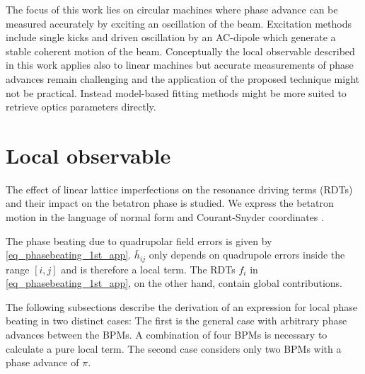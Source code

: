 The focus of this work lies on circular machines where phase advance can be measured accurately by
exciting an oscillation of the beam.
Excitation methods include single kicks and driven oscillation by an AC-dipole \cite{Miyamoto2008} which
generate a stable coherent motion of the beam.
Conceptually the local observable described in this work applies also to linear machines but accurate measurements
of phase advances remain challenging and the application of the proposed technique might not be practical.
Instead model-based fitting methods \cite{Zhang2018}
might be more suited to retrieve optics parameters directly.

%
%
%



\section{Local observable}
\label{sec:localobs}


The effect of linear
lattice imperfections on the resonance driving terms (RDTs) and their impact on the betatron phase is
studied.
We express the betatron motion in the language of normal form and Courant-Snyder coordinates
\cite{Bartolini1997}.

The phase beating due to quadrupolar field errors is given by \eqref{eq_phasebeating_1st_app}.
$\bar{h}_{ij}$ only depends on quadrupole errors inside the range $[i,j]$ and is therefore a local
term. The RDTs $f_i$ in \eqref{eq_phasebeating_1st_app}, on the other hand, contain global contributions.

The following subsections describe the derivation of an expression for local phase beating in two distinct
cases: The first is the general case with arbitrary phase advances between the BPMs. A combination of
four BPMs is necessary to calculate a pure local term. The second case considers only two BPMs with a
phase advance of $\pi$.

